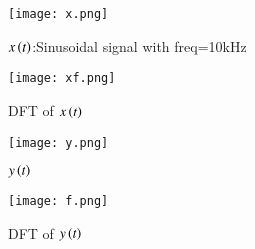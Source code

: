 \documentclass[journal,12pt,twocolumn]{IEEEtran}
\begin{document}
\begin{figure}[!h]
 \centering
 \texttt{[image: x.png]}
 \caption{$x\left(t\right)$:Sinusoidal signal with freq=10kHz}
\end{figure}
\begin{figure}[!h]
 \centering
 \texttt{[image: xf.png]}
 \caption{DFT of $x\left(t\right)$}
\end{figure}
\begin{figure}[!h]
 \centering
 \texttt{[image: y.png]}
 \caption{$y\left(t\right)$}
\end{figure}
\begin{figure}[!h]
 \centering
 \texttt{[image: f.png]}
 \caption{DFT of $y\left(t\right)$}
\end{figure}
\end{document}
